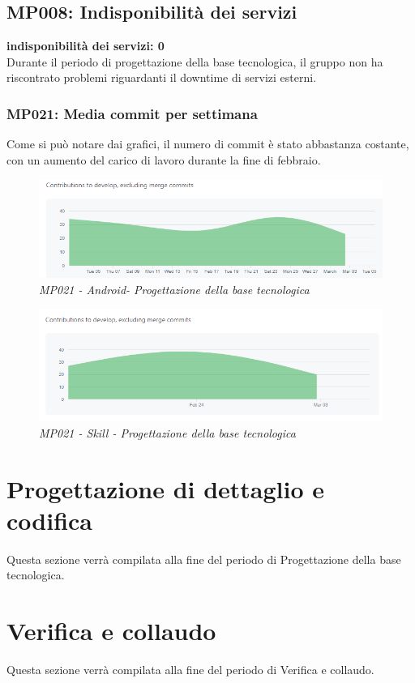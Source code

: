 \subsection{MP008: Indisponibilità dei servizi}
\textbf{indisponibilità dei servizi: 0}\\
Durante il periodo di progettazione della base tecnologica, il gruppo non ha riscontrato problemi riguardanti il downtime di servizi esterni.

\subsubsection{MP021: Media commit per settimana}
Come si può notare dai grafici, il numero di commit è stato abbastanza costante, con un aumento del carico di lavoro durante la fine di febbraio.
\begin{figure} [h]
    \centering
	\includegraphics[scale=0.7]{./images/dailycommits_kotlin.PNG}
    \caption{\textit{MP021 - Android- Progettazione della base tecnologica}}\label{}
\end{figure}
\begin{figure} [h]
    \centering
	\includegraphics[scale=0.7]{./images/daycommits_js.PNG}
    \caption{\textit{MP021 - Skill - Progettazione della base tecnologica}}\label{}
\end{figure}

\newpage
\section{Progettazione di dettaglio e codifica}
Questa sezione verrà compilata alla fine del periodo di Progettazione della base tecnologica.
\section{Verifica e collaudo}
Questa sezione verrà compilata alla fine del periodo di Verifica e collaudo.